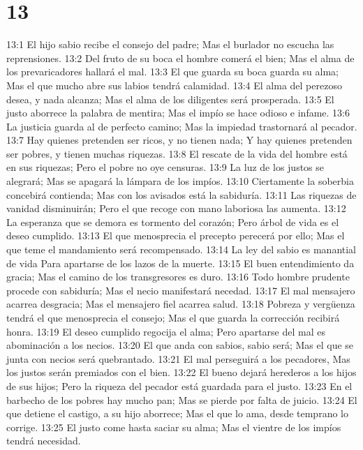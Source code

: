 \chapter{13}


13:1 El hijo sabio recibe el consejo del padre;  
Mas el burlador no escucha las reprensiones.  
13:2 Del fruto de su boca el hombre comerá el bien;  
Mas el alma de los prevaricadores hallará el mal.  
13:3 El que guarda su boca guarda su alma;  
Mas el que mucho abre sus labios tendrá calamidad.  
13:4 El alma del perezoso desea, y nada alcanza;  
Mas el alma de los diligentes será prosperada.  
13:5 El justo aborrece la palabra de mentira;  
Mas el impío se hace odioso e infame.  
13:6 La justicia guarda al de perfecto camino;  
Mas la impiedad trastornará al pecador.  
13:7 Hay quienes pretenden ser ricos, y no tienen nada;  
Y hay quienes pretenden ser pobres, y tienen muchas riquezas.  
13:8 El rescate de la vida del hombre está en sus riquezas;  
Pero el pobre no oye censuras.  
13:9 La luz de los justos se alegrará;  
Mas se apagará la lámpara de los impíos.  
13:10 Ciertamente la soberbia concebirá contienda;  
Mas con los avisados está la sabiduría.  
13:11 Las riquezas de vanidad disminuirán;  
Pero el que recoge con mano laboriosa las aumenta.  
13:12 La esperanza que se demora es tormento del corazón;  
Pero árbol de vida es el deseo cumplido.  
13:13 El que menosprecia el precepto perecerá por ello;  
Mas el que teme el mandamiento será recompensado.  
13:14 La ley del sabio es manantial de vida  
Para apartarse de los lazos de la muerte.  
13:15 El buen entendimiento da gracia;  
Mas el camino de los transgresores es duro.  
13:16 Todo hombre prudente procede con sabiduría;  
Mas el necio manifestará necedad.  
13:17 El mal mensajero acarrea desgracia;  
Mas el mensajero fiel acarrea salud.  
13:18 Pobreza y vergüenza tendrá el que menosprecia el consejo;  
Mas el que guarda la corrección recibirá honra.  
13:19 El deseo cumplido regocija el alma;  
Pero apartarse del mal es abominación a los necios.  
13:20 El que anda con sabios, sabio será;  
Mas el que se junta con necios será quebrantado.  
13:21 El mal perseguirá a los pecadores,  
Mas los justos serán premiados con el bien.  
13:22 El bueno dejará herederos a los hijos de sus hijos;  
Pero la riqueza del pecador está guardada para el justo.  
13:23 En el barbecho de los pobres hay mucho pan;  
Mas se pierde por falta de juicio.  
13:24 El que detiene el castigo, a su hijo aborrece;  
Mas el que lo ama, desde temprano lo corrige.  
13:25 El justo come hasta saciar su alma;  
Mas el vientre de los impíos tendrá necesidad.  


